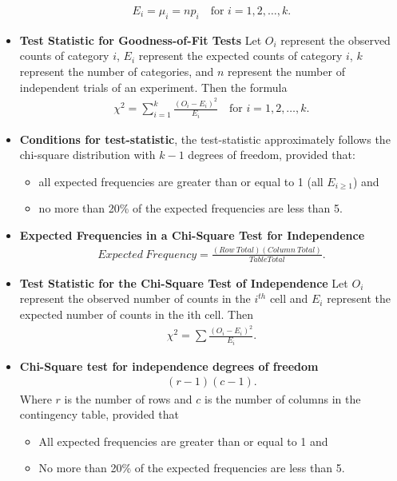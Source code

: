 \documentclass{report}
\begin{document}
\begin{itemize}
\begin{align*}
                E_i = \mu_i = np_i \quad \text{for } i = 1, 2, \ldots, k
            .\end{align*}
        \item \textbf{Test Statistic for Goodness-of-Fit Tests}
            Let \(O_i\) represent the observed counts of category \(i\), \(E_i\) represent the expected counts of category \(i\), \(k\) represent the number of categories, and \(n\) represent the number of independent trials of an experiment. Then the formula
            \begin{align*}
                \chi^2 = \sum_{i=1}^{k} \frac{(O_i - E_i)^2}{E_i} \quad \text{for } i = 1,2,\ldots,k
            .\end{align*}
        \item \textbf{Conditions for test-statistic}, the test-statistic approximately follows the chi-square distribution with $k-1 $ degrees of freedom, provided that:
            \begin{itemize}
                \item all expected frequencies are greater than or equal to 1 (all $E_{i \geq 1}$) and
                \item no more than 20\% of the expected frequencies are less than 5.
            \end{itemize}

        \item \textbf{Expected Frequencies in a Chi-Square Test for Independence}
            \begin{align*}
                Expected\ Frequency = \frac{(Row\ Total)(Column\ Total)}{Table Total} 
            .\end{align*}
        \item \textbf{Test Statistic for the Chi-Square Test of Independence}
            Let $O_{i}$ represent the observed number of counts in the $i^{th}$ cell and $E_{i}$ represent the expected number of counts in the ith cell. Then
            \begin{align*}
                \chi^{2} = \sum \frac{(O_{i} - E_{i})^{2}}{E_{i}}
            .\end{align*}
        \item \textbf{Chi-Square test for independence degrees of freedom}
            \begin{align*}
                (r-1)(c-1)
            .\end{align*}
             Where $r $ is the number of rows and $c $ is the number of columns in the contingency table, provided that
             \begin{itemize}
                 \item All expected frequencies are greater than or equal to 1 and
                 \item No more than 20\% of the expected frequencies are less than 5.
             \end{itemize}


        \end{itemize}
\end{document}
